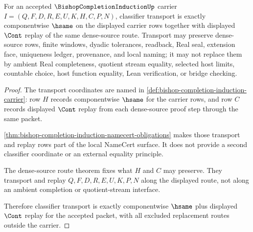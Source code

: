 \begin{theorem}
\label{thm:bishop-completion-induction-transport-exactness}
For an accepted $\BishopCompletionInductionUp$ carrier $I=(Q,F,D,R,E,U,K,H,C,P,N)$, classifier transport is exactly componentwise $\hsame$ on the displayed carrier rows together with displayed $\Cont$ replay of the same dense-source route. Transport may preserve dense-source rows, finite windows, dyadic tolerances, readback, Real seal, extension face, uniqueness ledger, provenance, and local naming; it may not replace them by ambient Real completeness, quotient stream equality, selected host limits, countable choice, host function equality, Lean verification, or bridge checking.
\end{theorem}
\begin{proof}
The transport coordinates are named in \autoref{def:bishop-completion-induction-carrier}: row $H$ records componentwise $\hsame$ for the carrier rows, and row $C$ records displayed $\Cont$ replay from each dense-source proof step through the same packet.

\autoref{thm:bishop-completion-induction-namecert-obligations} makes those transport and replay rows part of the local NameCert surface. It does not provide a second classifier coordinate or an external equality principle.

The dense-source route theorem fixes what $H$ and $C$ may preserve. They transport and replay $Q,F,D,R,E,U,K,P,N$ along the displayed route, not along an ambient completion or quotient-stream interface.

Therefore classifier transport is exactly componentwise $\hsame$ plus displayed $\Cont$ replay for the accepted packet, with all excluded replacement routes outside the carrier.
\end{proof}

